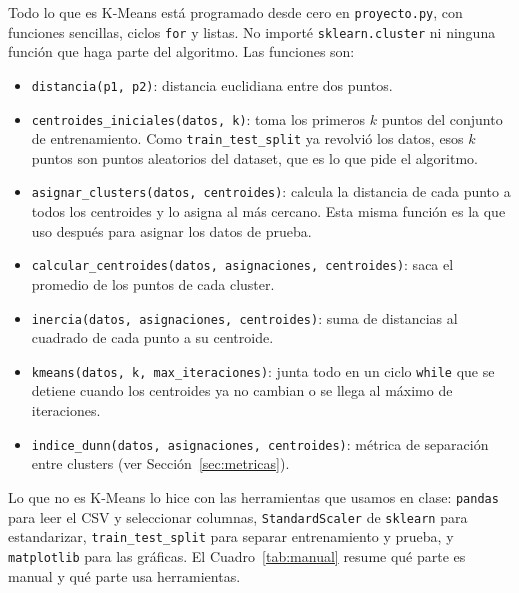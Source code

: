 \documentclass[11pt,a4paper]{article}
\begin{document}
Todo lo que es K-Means está programado desde cero en \texttt{proyecto.py}, con funciones sencillas, ciclos \texttt{for} y listas. No importé \texttt{sklearn.cluster} ni ninguna función que haga parte del algoritmo. Las funciones son:

\begin{itemize}
  \item \texttt{distancia(p1, p2)}: distancia euclidiana entre dos puntos.
  \item \texttt{centroides\_iniciales(datos, k)}: toma los primeros $k$ puntos del conjunto de entrenamiento. Como \texttt{train\_test\_split} ya revolvió los datos, esos $k$ puntos son puntos aleatorios del dataset, que es lo que pide el algoritmo.
  \item \texttt{asignar\_clusters(datos, centroides)}: calcula la distancia de cada punto a todos los centroides y lo asigna al más cercano. Esta misma función es la que uso después para asignar los datos de prueba.
  \item \texttt{calcular\_centroides(datos, asignaciones, centroides)}: saca el promedio de los puntos de cada cluster.
  \item \texttt{inercia(datos, asignaciones, centroides)}: suma de distancias al cuadrado de cada punto a su centroide.
  \item \texttt{kmeans(datos, k, max\_iteraciones)}: junta todo en un ciclo \texttt{while} que se detiene cuando los centroides ya no cambian o se llega al máximo de iteraciones.
  \item \texttt{indice\_dunn(datos, asignaciones, centroides)}: métrica de separación entre clusters (ver Sección~\ref{sec:metricas}).
\end{itemize}

Lo que no es K-Means lo hice con las herramientas que usamos en clase: \texttt{pandas} para leer el CSV y seleccionar columnas, \texttt{StandardScaler} de \texttt{sklearn} para estandarizar, \texttt{train\_test\_split} para separar entrenamiento y prueba, y \texttt{matplotlib} para las gráficas. El Cuadro~\ref{tab:manual} resume qué parte es manual y qué parte usa herramientas.
\end{document}

